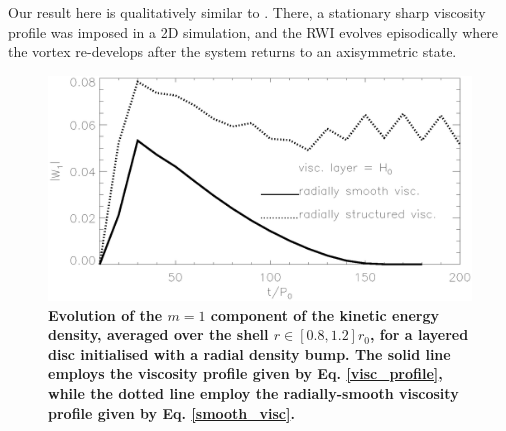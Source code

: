 {  Our result here is qualitatively similar to \cite{regaly12}. There, a stationary sharp viscosity
  profile was imposed in a 2D simulation, and the RWI 
  evolves episodically where the vortex re-develops after the system
  returns to an axisymmetric state.   

 \begin{figure}
  \centering
  \includegraphics[width=\linewidth]{figures/pdisk_kerz_cases_appendix1.ps}
  \caption{ {\bf Evolution of the $m=1$ component of the kinetic energy
    density, averaged over the shell $r\in[0.8,1.2]r_0$, for a layered 
    disc initialised with a radial density bump. 
    The solid line employs the viscosity profile given by 
    Eq. \ref{visc_profile}, while the dotted line employ the radially-smooth
    viscosity profile given by Eq. \ref{smooth_visc}.}\label{appen}}
  \end{figure}

}
